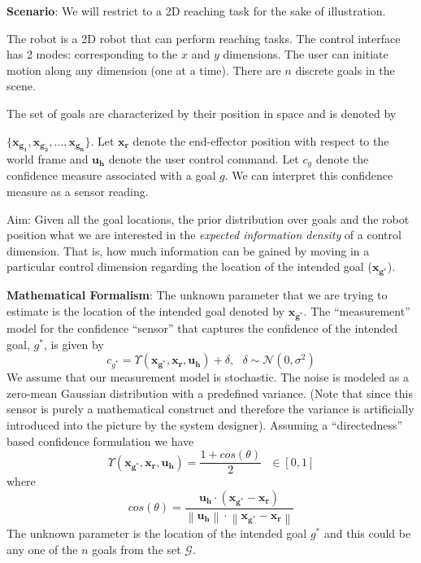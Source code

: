 \documentclass[]{article}
\newcommand{\norm}[1]{\left\lVert#1\right\rVert}
\begin{document}
\noindent\textbf{Scenario}: We will restrict to a 2D reaching task for the sake of illustration. 

\noindent The robot is a 2D robot that can perform reaching tasks. The control interface has 2 modes: corresponding to the $x$ and $y$ dimensions. The user can initiate motion along any dimension (one at a time). There are $n$ discrete goals in the scene. 

\noindent The set of goals are characterized by their position in space and is denoted by

\noindent$\{\boldsymbol{x_{g_1}},\boldsymbol{x_{g_2}},\dots, \boldsymbol{x_{g_n}}\}$.
Let $\boldsymbol{x_r}$ denote the end-effector position with respect to the world frame and $\boldsymbol{u_h}$ denote the user control command.  Let $c_g$ denote the confidence measure associated with a goal $g$. We can interpret this confidence measure as a sensor reading. 

\noindent Aim: Given all the goal locations, the prior distribution over goals and the robot position what we are interested in the \textit{expected information density} of a control dimension. That is, how much information can be gained by moving in a particular control dimension regarding the location of the intended goal ($\boldsymbol{x_{g^*}}$). 

\noindent\textbf{Mathematical Formalism}:
The unknown parameter that we are trying to estimate is the location of the intended goal denoted by $\boldsymbol{x_{g^*}}$.
The ``measurement'' model for the confidence ``sensor'' that captures the confidence of the intended goal, $g^*$, is given by 
\begin{equation*}
	c_{g^*} = \Upsilon(\boldsymbol{x_{g^*}}, \boldsymbol{x_r}, \boldsymbol{u_h}) + \delta, ~~~ \delta \sim \mathcal{N}(0, \sigma^2) 
\end{equation*}
We assume that our measurement model is stochastic. The noise is modeled as a zero-mean Gaussian distribution with a predefined variance. (Note that since this sensor is purely a mathematical construct and therefore the variance is artificially introduced into the picture by the system designer). Assuming a ``directedness'' based confidence formulation we have
\begin{equation*}
\Upsilon(\boldsymbol{x_{g^*}}, \boldsymbol{x_r}, \boldsymbol{u_h}) = \frac{1+cos(\theta)}{2} ~~~  \in [0,1]
\end{equation*}
where 
\begin{equation*}
cos(\theta) = \frac{\boldsymbol{u_h}\cdot(\boldsymbol{x_{g^*}} - \boldsymbol{x_r})}{\norm{\boldsymbol{u_h}}\cdot\norm{\boldsymbol{x_{g^*}} - \boldsymbol{x_r}}}
\end{equation*}
The unknown parameter is the location of the intended goal $g^*$ and this could be any one of the $n$ goals from the set $\mathcal{G}$.
\end{document}
